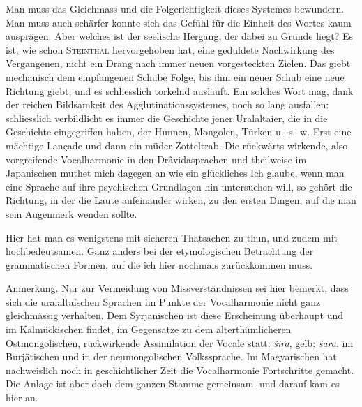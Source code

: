 Man muss das Gleichmass und die Folgerichtigkeit dieses Systemes bewundern. Man muss auch  schärfer konnte sich das Gefühl für die Einheit des Wortes kaum ausprägen. Aber welches ist der seelische Hergang, der dabei zu Grunde liegt? Es ist, wie schon \textsc{Steinthal} hervorgehoben hat, eine geduldete Nachwirkung des Vergangenen, nicht ein Drang nach immer neuen vorgesteckten Zielen. Das giebt \label{fp.383} mechanisch dem empfangenen Schube Folge, bis ihm ein neuer Schub eine neue Richtung giebt, und es schliesslich torkelnd ausläuft. Ein solches Wort mag, dank der reichen Bildsamkeit des Agglutinationssystemes, noch so lang ausfallen: schliesslich verbildlicht es immer die Geschichte jener Uralaltaier, die in die Geschichte eingegriffen haben, der Hunnen, Mongolen, Türken u.~s.~w. Erst eine mächtige Lançade und dann ein müder Zotteltrab. Die rückwärts wirkende, also vorgreifende Vocalharmonie in den Drâvidasprachen und theilweise im Japanischen muthet mich dagegen an wie ein glückliches   Ich glaube, wenn man eine Sprache auf ihre psychischen Grundlagen hin untersuchen will, so gehört die Richtung, in der die Laute aufeinander wirken, zu den ersten Dingen, auf die man sein Augenmerk wenden sollte.

\label{sp.403}

Hier hat man es wenigstens mit sicheren Thatsachen zu thun, und zudem mit hochbedeutsamen. Ganz anders bei der etymologischen Betrachtung der grammatischen Formen, auf die ich hier nochmals zurückkommen muss.

\begin{styleAnmerk}
Anmerkung. Nur zur Vermeidung von Missverständnissen sei hier bemerkt, dass sich die uralaltaischen Sprachen im Punkte der Vocalharmonie nicht ganz gleichmässig verhalten. Dem Syrjänischen ist diese Erscheinung überhaupt   und im Kalmückischen findet, im Gegensatze zu dem alterthümlicheren Ostmongolischen, rückwirkende Assimilation der Vocale statt: \textit{šira}, gelb: \textit{šara}.  im Burjätischen und in der neumongolischen Volkssprache. Im Magyarischen hat nachweislich noch in geschichtlicher Zeit die Vocalharmonie Fortschritte gemacht. Die Anlage ist aber doch dem ganzen Stamme gemeinsam, und darauf kam es hier an.
\end{styleAnmerk}


